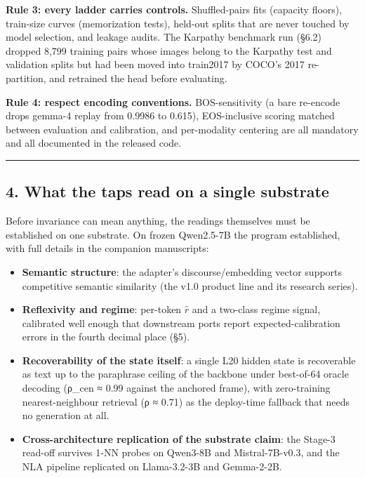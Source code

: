 \documentclass[
  11pt,
]{article}
\providecommand{\tightlist}{%
  \setlength{\itemsep}{0pt}\setlength{\parskip}{0pt}}
\begin{document}
\textbf{Rule 3: every ladder carries controls.} Shuffled-pairs fits
(capacity floors), train-size curves (memorization tests), held-out
splits that are never touched by model selection, and leakage audits.
The Karpathy benchmark run (§6.2) dropped 8,799 training pairs whose
images belong to the Karpathy test and validation splits but had been
moved into train2017 by COCO's 2017 re-partition, and retrained the head
before evaluating.

\textbf{Rule 4: respect encoding conventions.} BOS-sensitivity (a bare
re-encode drops gemma-4 replay from 0.9986 to 0.615), EOS-inclusive
scoring matched between evaluation and calibration, and per-modality
centering are all mandatory and all documented in the released code.

\begin{center}\rule{0.5\linewidth}{0.5pt}\end{center}

\subsection{4. What the taps read on a single
substrate}\label{what-the-taps-read-on-a-single-substrate}

Before invariance can mean anything, the readings themselves must be
established on one substrate. On frozen Qwen2.5-7B the program
established, with full details in the companion manuscripts:

\begin{itemize}
\tightlist
\item
  \textbf{Semantic structure}: the adapter's discourse/embedding vector
  supports competitive semantic similarity (the v1.0 product line and
  its research series).
\item
  \textbf{Reflexivity and regime}: per-token \(\hat{r}\) and a two-class
  regime signal, calibrated well enough that downstream ports report
  expected-calibration errors in the fourth decimal place (§5).
\item
  \textbf{Recoverability of the state itself}: a single L20 hidden state
  is recoverable as text up to the paraphrase ceiling of the backbone
  under best-of-64 oracle decoding (ρ\_cen ≈ 0.99 against the anchored
  frame), with zero-training nearest-neighbour retrieval (ρ ≈ 0.71) as
  the deploy-time fallback that needs no generation at all.
\item
  \textbf{Cross-architecture replication of the substrate claim}: the
  Stage-3 read-off survives 1-NN probes on Qwen3-8B and Mistral-7B-v0.3,
  and the NLA pipeline replicated on Llama-3.2-3B and Gemma-2-2B.
\end{itemize}
\end{document}
